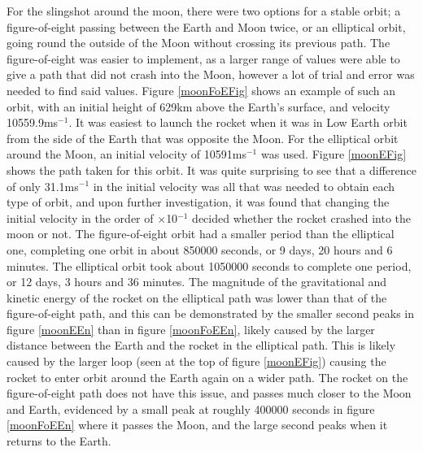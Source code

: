 \documentclass[twocolumn,prl,nobalancelastpage,aps,10pt]{revtex4-1}
\begin{document}
For the slingshot around the moon, there were two options for a stable orbit; a figure-of-eight passing between the Earth and Moon twice, or an elliptical orbit, going round the outside of the Moon without crossing its previous path. The figure-of-eight was easier to implement, as a larger range of values were able to give a path that did not crash into the Moon, however a lot of trial and error was needed to find said values. Figure \ref{moonFoEFig} shows an example of such an orbit, with an initial height of 629km above the Earth's surface, and velocity 10559.9ms$^{-1}$. It was easiest to launch the rocket when it was in Low Earth orbit from the side of the Earth that was opposite the Moon. For the elliptical orbit around the Moon, an initial velocity of 10591ms$^{-1}$ was used. Figure \ref{moonEFig} shows the path taken for this orbit. It was quite surprising to see that a difference of only 31.1ms$^{-1}$ in the initial velocity was all that was needed to obtain each type of orbit, and upon further investigation, it was found that changing the initial velocity in the order of $\times$10$^{-1}$ decided whether the rocket crashed into the moon or not. The figure-of-eight orbit had a smaller period than the elliptical one, completing one orbit in about 850000 seconds, or 9 days, 20 hours and 6 minutes. The elliptical orbit took about 1050000 seconds to complete one period, or 12 days, 3 hours and 36 minutes. The magnitude of the gravitational and kinetic energy of the rocket on the elliptical path was lower than that of the figure-of-eight path, and this can be demonstrated by the smaller second peaks in figure \ref{moonEEn} than in figure \ref{moonFoEEn}, likely caused by the larger distance between the Earth and the rocket in the elliptical path. This is likely caused by the larger loop (seen at the top of figure \ref{moonEFig}) causing the rocket to enter orbit around the Earth again on a wider path. The rocket on the figure-of-eight path does not have this issue, and passes much closer to the Moon and Earth, evidenced by a small peak at roughly 400000 seconds in figure \ref{moonFoEEn} where it passes the Moon, and the large second peaks when it returns to the Earth.
\end{document}
